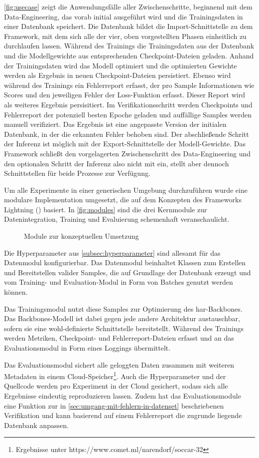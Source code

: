 \autoref{fig:usecase} zeigt die Anwendungsfälle aller Zwischenschritte, beginnend mit dem Data-Engineering, das vorab initial ausgeführt wird und die Trainingsdaten in einer Datenbank speichert.
Die Datenbank bildet die Import-Schnittstelle zu dem Framework, mit dem sich alle der vier, oben vorgestellten Phasen einheitlich zu durchlaufen lassen.
Während des Trainings die Trainingsdaten aus der Datenbank und die Modellgewichte aus entsprechenden Checkpoint-Dateien geladen.
Anhand der Trainingsdaten wird das Modell optimiert und die optimierten Gewichte werden als Ergebnis in neuen Checkpoint-Dateien persistiert.
Ebenso wird während des Trainings ein Fehlerreport erfasst, der pro Sample Informationen wie Scores und den jeweiligen Fehler der Loss-Funktion erfasst.
Dieser Report wird als weiteres Ergebnis persisitiert.
Im Verifikationsschritt werden Checkpoints und Fehlerreport der potenziell besten Epoche geladen und auffällige Samples werden manuell verifiziert.
Das Ergebnis ist eine angepasste Version der initialen Datenbank, in der die erkannten Fehler behoben sind.
Der abschließende Schritt der Inferenz ist möglich mit der Export-Schnittstelle der Modell-Gewichte.
Das Framework schließt den vorgelagerten Zwischenschritt des Data-Engineering und den optionalen Schritt der Inferenz also nicht mit ein, stellt aber dennoch Schnittstellen für beide Prozesse zur Verfügung.


Um alle Experimente in einer generischen Umgebung durchzuführen wurde eine modulare Implementation umgesetzt, die auf dem Konzepten des Frameworks Lightning (\cite{Falcon19}) basiert.
In \autoref{fig:modules} sind die drei Kernmodule zur Datenintegration, Training und Evaluierung schemenhaft veranschaulicht.

\begin{figure}
    \centering
    \caption{Module zur konzeptuellen Umsetzung}
    \label{fig:modules}
\end{figure}

Die Hyperparameter aus \autoref{subsec:hyperparameter} sind allesamt für das Datenmodul konfigurierbar.
Das Datenmodul beinhaltet Klassen zum Erstellen und Bereitstellen valider Samples, die auf Grundlage der Datenbank erzeugt und vom Training- und Evaluation-Modul in Form von Batches genutzt werden können.

Das Trainingsmodul nutzt diese Samples zur Optimierung des \gls{har}-Backbones.
Das Backbones-Modell ist dabei gegen jede andere Architektur austauschbar, sofern sie eine wohl-definierte Schnittstelle bereitstellt.
Während des Trainings werden Metriken, Checkpoint- und Fehlerreport-Dateien erfasst und an das Evaluationsmodul in Form eines Loggings übermittelt.

Das Evaluationsmodul sichert alle geloggten Daten zusammen mit weiteren Metadaten in einem Cloud-Speicher\footnote{Ergebnisse unter https://www.comet.ml/narendorf/soccar-32}.
Auch die Hyperparameter und der Quellcode werden pro Experiment in der Cloud gesichert, sodass sich alle Ergebnisse eindeutig reproduzieren lassen.
Zudem hat das Evaluationsmodule eine Funktion zur in \autoref{sec:umgang-mit-fehlern-in-datenset} beschriebenen Verifikation und kann basierend auf einem Fehlerreport die zugrunde liegende Datenbank anpassen.

